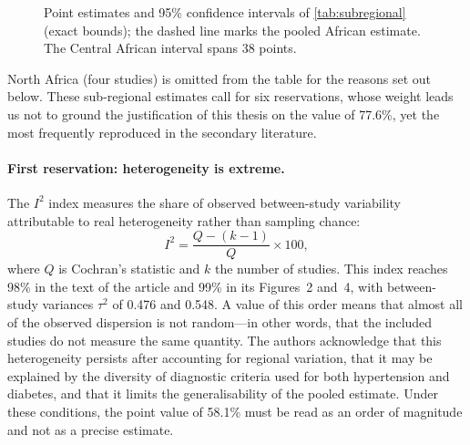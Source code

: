 \documentclass[12pt,a4paper,oneside]{report}
\begin{document}
\begin{figure}[htbp]
\centering
{}
\caption{Point estimates and 95\% confidence intervals of \cref{tab:subregional} (exact bounds); the dashed line marks the pooled African estimate. The Central African interval spans 38 points.}\label{fig:forest}
\end{figure}

North Africa (four studies) is omitted from the table for the reasons set out below. These sub-regional estimates call for six reservations, whose weight leads us not to ground the justification of this thesis on the value of 77.6\%, yet the most frequently reproduced in the secondary literature.

\paragraph{First reservation: heterogeneity is extreme.} The $I^2$ index measures the share of observed between-study variability attributable to real heterogeneity rather than sampling chance:
\begin{equation}
  I^2 = \frac{Q-(k-1)}{Q}\times 100,
\end{equation}
where $Q$ is Cochran's statistic and $k$ the number of studies. This index reaches 98\% in the text of the article and 99\% in its Figures~2 and~4, with between-study variances $\tau^2$ of 0.476 and 0.548. A value of this order means that almost all of the observed dispersion is not random---in other words, that the included studies do not measure the same quantity. The authors acknowledge that this heterogeneity persists after accounting for regional variation, that it may be explained by the diversity of diagnostic criteria used for both hypertension and diabetes, and that it limits the generalisability of the pooled estimate. Under these conditions, the point value of 58.1\% must be read as an order of magnitude and not as a precise estimate.
\end{document}
